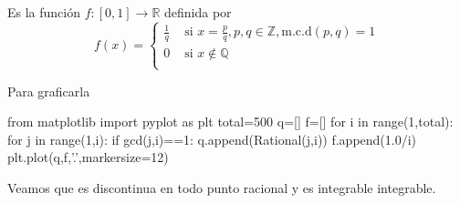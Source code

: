 \begin{ejemplo} Es la función $f:[0,1]\to\mathbb{R}$ definida por 
\[
 f(x)=\begin{cases} \frac{1}{q} & \text{ si } x=\frac{p}{q},p,q\in\mathbb{Z}, \text{m.c.d}(p,q)=1
 \\0 & \text{ si }   x\notin\mathbb{Q}\\
\end{cases}
\]
\end{ejemplo}

Para graficarla

\begin{sympyverbatim}
from matplotlib import pyplot as plt
total=500
q=[]
f=[]
for i in range(1,total):
    for j in range(1,i):
        if gcd(j,i)==1:
            q.append(Rational(j,i))
            f.append(1.0/i)
plt.plot(q,f,'.',markersize=12)
\end{sympyverbatim}

Veamos que es discontinua en todo punto racional y es integrable integrable.

